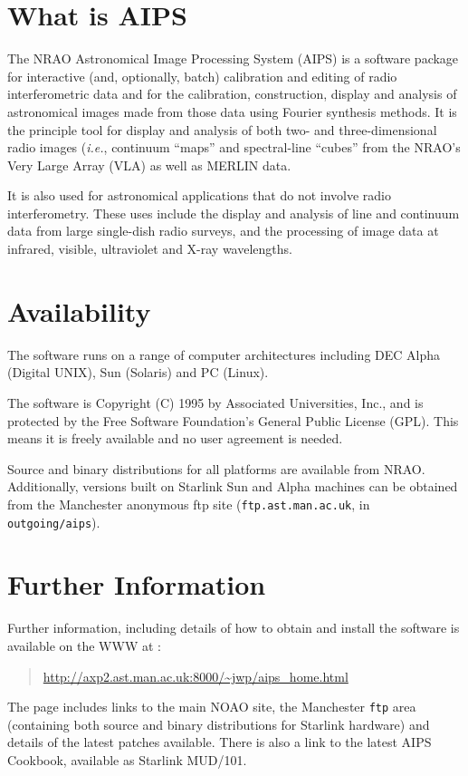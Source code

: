 \documentclass[11pt,nolof,noabs]{starlink}
\begin{document}
\scfrontmatter

\section{What is AIPS}

The NRAO Astronomical Image Processing System (AIPS) is a software
package for interactive (and, optionally, batch) calibration and
editing of radio interferometric data and for the calibration,
construction, display and analysis of astronomical images made from
those data using Fourier synthesis methods.  It is the principle tool
for display and analysis of both two- and three-dimensional radio
images (\emph{i.e.}, continuum ``maps'' and spectral-line ``cubes''
from the NRAO's Very Large Array (VLA) as well as MERLIN data.

It is also used for astronomical applications that do not involve radio
interferometry.  These uses include the display and analysis of line
and continuum data from large single-dish radio surveys, and the
processing of image data at infrared, visible, ultraviolet and X-ray
wavelengths.

\section{Availability}

The software runs on a range of computer architectures including DEC
Alpha (Digital UNIX), Sun (Solaris) and PC (Linux).

The software is Copyright (C) 1995 by Associated Universities, Inc.,
and is protected by the Free Software Foundation's General Public
License (GPL).  This means it is freely available and no user
agreement is needed.

Source and binary distributions for all platforms are available from
NRAO. Additionally, versions built on Starlink Sun and Alpha machines
can be obtained from the Manchester anonymous ftp site (\texttt{ftp.ast.man.ac.uk}, in \texttt{outgoing/aips}).

\section{Further Information}

Further information, including details of how to obtain and install
the software is available on the WWW at :

\begin{quote}
\url{http://axp2.ast.man.ac.uk:8000/~jwp/aips_home.html}
\end{quote}

The page includes links to the main NOAO site, the Manchester \texttt{ftp}
area (containing both source and binary distributions for Starlink
hardware) and details of the latest patches available.  There is also
a link to the latest AIPS Cookbook, available as Starlink MUD/101.
\end{document}
